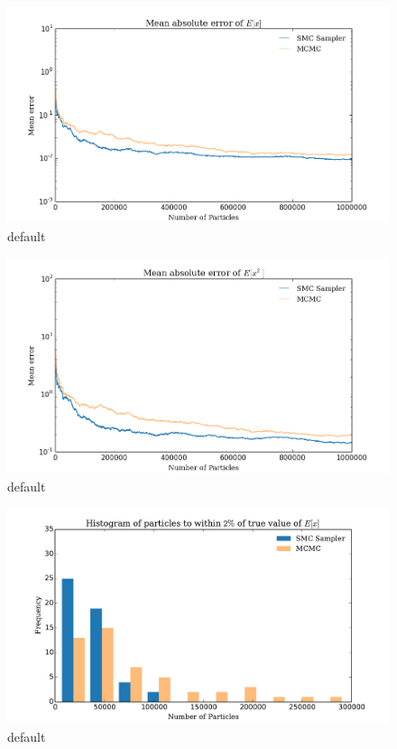 \documentclass[12pt]{elsarticle}
\begin{document}
\begin{figure}[htbp]
\begin{center}
\includegraphics[width = \textwidth]{plots/E_X.png}
\caption{default}
\label{default}
\end{center}
\end{figure}

\begin{figure}[htbp]
\begin{center}
\includegraphics[width = \textwidth]{plots/E_X2.png}
\caption{default}
\label{default}
\end{center}
\end{figure}


\begin{figure}[htbp]
\begin{center}
\includegraphics[width = \textwidth]{plots/iterations.pdf}
\caption{default}
\label{default}
\end{center}
\end{figure}
\end{document}
